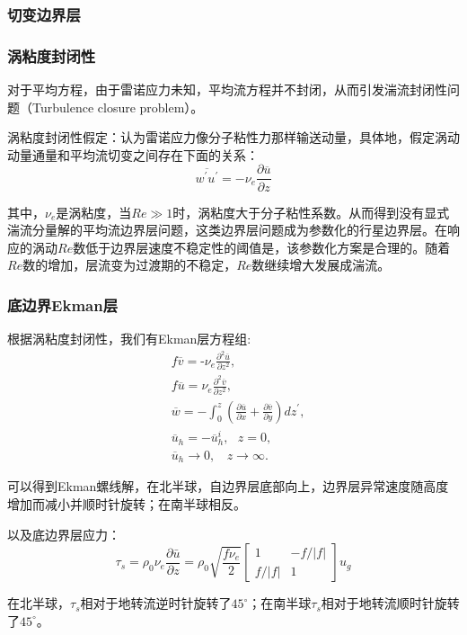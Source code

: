 \documentclass{article}
\begin{document}
\subsubsection{切变边界层}
\subsubsection{涡粘度封闭性}
对于平均方程，由于雷诺应力未知，平均流方程并不封闭，从而引发湍流封闭性问题（Turbulence closure problem）。

涡粘度封闭性假定：认为雷诺应力像分子粘性力那样输送动量，具体地，假定涡动动量通量和平均流切变之间存在下面的关系：
$$\overline{{w}^{\prime}{u}^{\prime}}=-{{\nu }_{e}}\frac{\partial \overline{u}}{\partial z}$$

其中，${\nu }_{e}$是涡粘度，当$Re \gg 1$时，涡粘度大于分子粘性系数。从而得到没有显式湍流分量解的平均流边界层问题，这类边界层问题成为参数化的行星边界层。在响应的涡动$Re$数低于边界层速度不稳定性的阈值是，该参数化方案是合理的。随着$Re$数的增加，层流变为过渡期的不稳定，$Re$数继续增大发展成湍流。

\subsubsection{底边界Ekman层}
根据涡粘度封闭性，我们有Ekman层方程组:
\begin{align}
  & f\overline{v}=\text{-}{{\nu }_{e}}\frac{{{\partial }^{2}}\overline{u}}{\partial {{z}^{2}}}, \\ 
 & f\overline{u}={{\nu }_{e}}\frac{{{\partial }^{2}}\overline{v}}{\partial {{z}^{2}}}, \\ 
 & \overline{w}=-\int_{0}^{z}{(\frac{\partial \overline{u}}{\partial x}+\frac{\partial \overline{v}}{\partial y})}d{z}^{\prime}, \\ 
 & {{\overline{u}}_{h}}=-\overline{u}_{h}^{i},\ \ \ z=0, \\ 
 & {{\overline{u}}_{h}}\to 0,\ \ \ \ z\to \infty .\ \ \ \  
\end{align}

可以得到Ekman螺线解，在北半球，自边界层底部向上，边界层异常速度随高度增加而减小并顺时针旋转；在南半球相反。

以及底边界层应力：
$$\tau_s=\rho_0\nu_e\frac{\partial\bar{u}}{\partial z}=\rho_0\sqrt{\frac{f\nu_e}{2}}\begin{bmatrix}
    1&-f/|f|\\
    f/|f|& 1
\end{bmatrix}u_g$$

在北半球，$\tau_s$相对于地转流逆时针旋转了$45^{\circ}$；在南半球$\tau_s$相对于地转流顺时针旋转了$45^{\circ}$。
\end{document}
